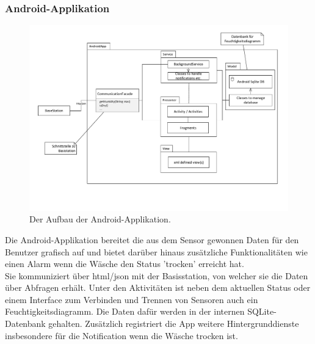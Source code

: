 \subsubsection{Android-Applikation}
\begin{figure}[htb] 
	\centerline{\includegraphics[scale=.4]{Architektur/App_v2.pdf} }
	\caption{Der Aufbau der Android-Applikation.}
\end{figure}
Die Android-Applikation bereitet die aus dem Sensor gewonnen Daten für den Benutzer grafisch auf und bietet darüber hinaus zusätzliche Funktionalitäten wie einen Alarm wenn die Wäsche den Status 'trocken' erreicht hat.\\
Sie kommuniziert über html/json mit der Basisstation, von welcher sie die Daten über Abfragen erhält. Unter den Aktivitäten ist neben dem aktuellen Status oder einem Interface zum Verbinden und Trennen von Sensoren auch ein Feuchtigkeitsdiagramm. Die Daten dafür werden in der internen SQLite-Datenbank gehalten. Zusätzlich registriert die App weitere Hintergrunddienste insbesondere für die Notification wenn die Wäsche trocken ist.